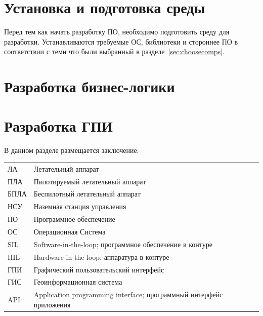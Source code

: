 \documentclass[specification,annotation]{itmo-student-thesis}
\begin{document}
\section{Установка и подготовка среды}\label{sec:devenviron}

Перед тем как начать разработку ПО, необходимо подготовить среду для разработки.
Устанавливаются требуемые ОС, библиотеки и стороннее ПО в соответствии с теми
что были выбранный в разделе~\ref{sec:choosecomps}.

\section{Разработка бизнес-логики}\label{sec:devlogic}

\section{Разработка ГПИ}\label{sec:devgui}

\chapterconclusion

\startconclusionpage

В данном разделе размещается заключение.

\startabbreviationspage

\begin{table}[!h]
  \centering
  \begin{tabularx}{\textwidth}{L{0.5} L{1.5}}
    \hline
    ЛА & Летательный аппарат \\
    ПЛА & Пилотируемый летательный аппарат \\
    БПЛА & Беспилотный летательный аппарат \\
    НСУ & Наземная станция управления \\
    ПО & Программное обеспечение \\
    ОС & Операционная Система \\
    SIL & Software-in-the-loop; программное обеспечение в контуре \\
    HIL & Hardware-in-the-loop; аппаратура в контуре \\
    ГПИ & Графический пользовательский интерфейс \\
    ГИС & Геоинформационная система \\
    API & Application programming interface; программный интерфейс приложения \\
    \hline
  \end{tabularx}
\end{table}

\printmainbibliography

\appendix
\end{document}

